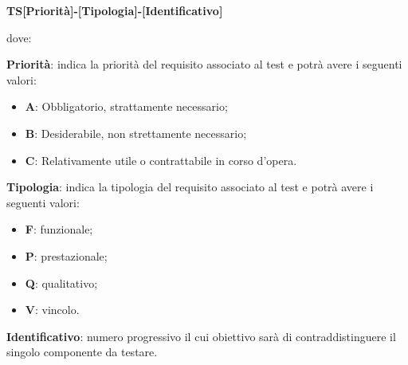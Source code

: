 		\begin{center}
		\textbf{TS[Priorità]-[Tipologia]-[Identificativo]}
		\end{center}
		dove: 
		
		\textbf{Priorità}: indica la priorità del requisito associato al test e potrà avere i seguenti valori:
		\begin{itemize}
		 	\item \textbf{A}: Obbligatorio, strattamente necessario;
		 	\item \textbf{B}: Desiderabile, non strettamente necessario;
		 	\item \textbf{C}: Relativamente utile o contrattabile in corso d'opera. 
		 \end{itemize} 
		 \textbf{Tipologia}: indica la tipologia del requisito associato al test e potrà avere i seguenti valori:
		 \begin{itemize}
		 	\item \textbf{F}: funzionale;
		 	\item \textbf{P}: prestazionale;
		 	\item \textbf{Q}: qualitativo;
		 	\item \textbf{V}: vincolo.
		 \end{itemize}
		\textbf{Identificativo}: numero progressivo il cui obiettivo sarà di contraddistinguere il singolo componente da testare.

